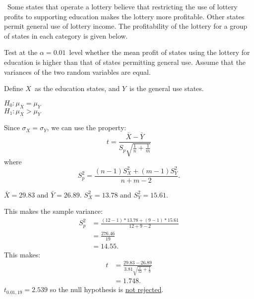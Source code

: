 \begin{problem}
  ~Some states that operate a lottery believe that restricting the use of lottery profits to supporting education makes the lottery more profitable. Other states permit general use of lottery income.  The profitability of the lottery for a group of states in each category is given below.

  Test at the ${\alpha = 0.01}$~level whether the mean profit of states using the lottery for education is higher than that of states permitting general use. Assume that the variances of the two random variables are equal.
\end{problem}

Define $X$~as the education states, and $Y$~is the general use states.

\noindent
${H_0: \mu_{X} = \mu_{Y}}$ \\
${H_1: \mu_{X} > \mu_{Y}}$

\noindent
Since ${\sigma_{X} = \sigma_{Y}}$, we can use the property:
\begin{equation}
  t = \frac{\bar{X} - \bar{Y}}{S_{p} \sqrt{\frac{1}{n} + \frac{1}{m}}}
\end{equation}
\noindent
where
\begin{equation}
  S^{2}_{p} = \frac{(n-1)S^{2}_{X} + (m-1)S^{2}_{Y}}{n + m - 2}\text{.}
\end{equation}

\noindent
${\bar{X} = 29.83}$ and ${\bar{Y} = 26.89}$. ${S^{2}_{X} = 13.78}$ and ${S^{2}_{Y} = 15.61}$.

\noindent
This makes the sample variance:
\begin{align}
  S^{2}_{p} &= \frac{(12 - 1) * 13.78 + (9 - 1) * 15.61}{12 + 9 - 2} \\
            &= \frac{276.46}{19} \\
            &= 14.55 \text{.}
\end{align}
This makes:
\begin{align}
  t &=  \frac{29.83 - 26.89}{3.81 \sqrt{\frac{1}{12} + \frac{1}{9}}} \\
    &= 1.748\text{.}
\end{align}
\noindent
${t_{0.01,19} = 2.539}$ so the null hypothesis is \underline{not rejected}.
